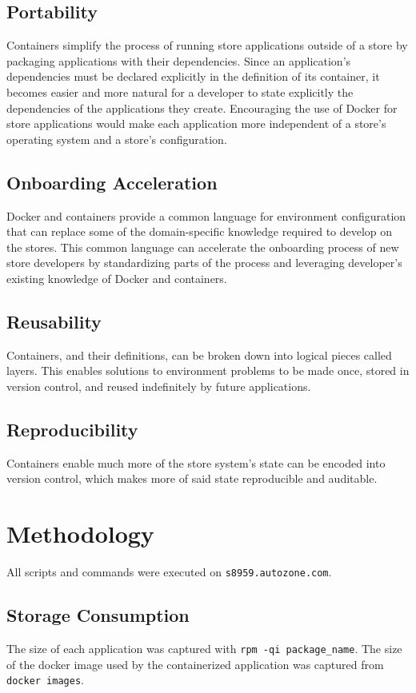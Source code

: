 \documentclass{article}
\begin{document}
\subsection{Portability}
Containers simplify the process of running store applications outside of a store by packaging applications with their dependencies. Since an application's dependencies must be declared explicitly in the definition of its container, it becomes easier and more natural for a developer to state explicitly the dependencies of the applications they create. Encouraging the use of Docker for store applications would make each application more independent of a store's operating system and a store's configuration.

\subsection{Onboarding Acceleration}
Docker and containers provide a common language for environment configuration that can replace some of the domain-specific knowledge required to develop on the stores. This common language can accelerate the onboarding process of new store developers by standardizing parts of the process and leveraging developer's existing knowledge of Docker and containers.

\subsection{Reusability}
Containers, and their definitions, can be broken down into logical pieces called layers. This enables solutions to environment problems to be made once, stored in version control, and reused indefinitely by future applications.

\subsection{Reproducibility}
Containers enable much more of the store system's state can be encoded into version control, which makes more of said state reproducible and auditable.

\section{Methodology}
All scripts and commands were executed on \texttt{s8959.autozone.com}.

\subsection{Storage Consumption}
The size of each application was captured with \texttt{rpm -qi package\_name}. The size of the docker image used by the containerized application was captured from \texttt{docker images}.
\end{document}
